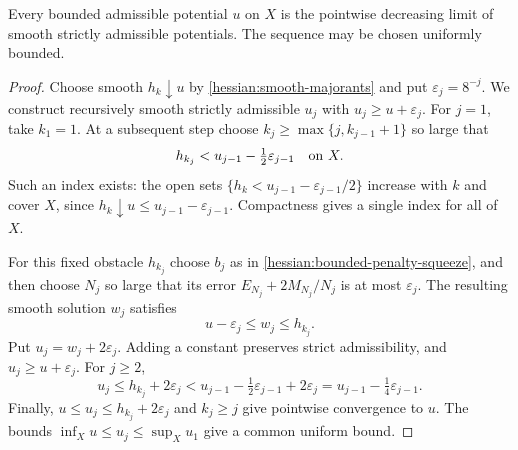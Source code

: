 \begin{theorem}\label{hessian:bounded-decreasing-approximation}
Every bounded admissible potential $u$ on $X$ is the pointwise
decreasing limit of smooth strictly admissible potentials.
The sequence may be chosen uniformly bounded.
\end{theorem}
\begin{proof}
Choose smooth $h_k\downarrow u$ by \cref{hessian:smooth-majorants}
and put $\varepsilon_j=8^{-j}$. We construct recursively smooth strictly
admissible $u_j$ with $u_j\geq u+\varepsilon_j$.
For $j=1$, take $k_1=1$. At a subsequent step choose
$k_j\geq\max\{j,k_{j-1}+1\}$ so large that
\[
 h_{k_j}<u_{j-1}-\tfrac12\varepsilon_{j-1}\quad\hbox{on }X.
\]
Such an index exists: the open sets
$\{h_k<u_{j-1}-\varepsilon_{j-1}/2\}$ increase with $k$ and cover
$X$, since $h_k\downarrow u\leq u_{j-1}-\varepsilon_{j-1}$.
Compactness gives a single index for all of $X$.

For this fixed obstacle $h_{k_j}$ choose $b_j$ as in
\cref{hessian:bounded-penalty-squeeze}, and then choose $N_j$ so large
that its error $E_{N_j}+2M_{N_j}/N_j$ is at most $\varepsilon_j$.
The resulting smooth solution $w_j$ satisfies
\[
 u-\varepsilon_j\leq w_j\leq h_{k_j}.
\]
Put $u_j=w_j+2\varepsilon_j$. Adding a constant preserves strict
admissibility, and $u_j\geq u+\varepsilon_j$. For $j\geq2$,
\[
 u_j\leq h_{k_j}+2\varepsilon_j
 <u_{j-1}-\tfrac12\varepsilon_{j-1}+2\varepsilon_j
 =u_{j-1}-\tfrac14\varepsilon_{j-1}.
\]
Finally, $u\leq u_j\leq h_{k_j}+2\varepsilon_j$ and $k_j\geq j$
give pointwise convergence to $u$. The bounds
$\inf_X u\leq u_j\leq\sup_X u_1$ give a common uniform bound.
\end{proof}
